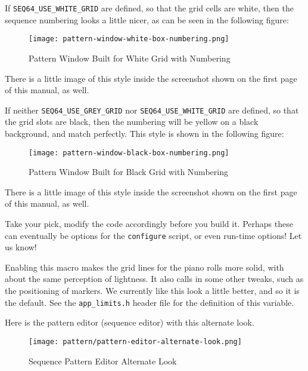         If \texttt{SEQ64\_USE\_WHITE\_GRID}
        are defined, so that the grid cells are white, then the sequence
        numbering looks a little nicer, as can be seen in the following
        figure:

\begin{figure}[H]
   \centering 
   \texttt{[image: pattern-window-white-box-numbering.png]}
   \caption{Pattern Window Built for White Grid with Numbering}
   \label{fig:seq64_build_white_box_numbering}
\end{figure}

        There is a little image of this style inside the screenshot shown on
        the first page of this manual, as well.

        If neither \texttt{SEQ64\_USE\_GREY\_GRID} nor
        \texttt{SEQ64\_USE\_WHITE\_GRID} are defined, so that the grid slots
        are black, then the numbering will be yellow on a black background, and
        match perfectly.  This style is shown in the following figure:

\begin{figure}[H]
   \centering 
   \texttt{[image: pattern-window-black-box-numbering.png]}
   \caption{Pattern Window Built for Black Grid with Numbering}
   \label{fig:seq64_build_black_box_numbering}
\end{figure}

      There is a little image of this style inside the screenshot shown on
      the first page of this manual, as well.

      Take your pick, modify the code accordingly before you build it.
      Perhaps these can eventually be options for the \texttt{configure}
      script, or even run-time options!  Let us know!

        Enabling this macro makes the grid lines for the piano rolls
        more solid, with about the same perception of lightness.
        It also calls in some other tweaks, such as the positioning of
        markers.  We currently like this look a little better, and so it is
        the default.  See the \texttt{app\_limits.h}
        header file for the definition of this variable.

        Here is the pattern editor (sequence editor) with this alternate look.

\begin{figure}[H]
   \centering 
   \texttt{[image: pattern/pattern-editor-alternate-look.png]}
   \caption{Sequence Pattern Editor Alternate Look}
   \label{fig:seq64_pattern_editor_alternate_look}
\end{figure}

